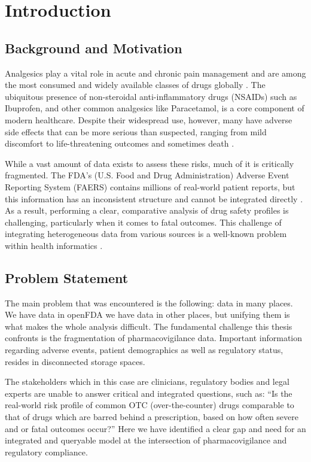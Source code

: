 \section{Introduction}
\subsection{Background and Motivation}
Analgesics play a vital role in acute and chronic pain management and are among the most consumed and widely available classes of drugs globally \cite{Jaeschke2015}. The ubiquitous presence of non-steroidal anti-inflammatory drugs (NSAIDs) such as Ibuprofen, and other common analgesics like Paracetamol, is a core component of modern healthcare. Despite their widespread use, however, many have adverse side effects that can be more serious than suspected, ranging from mild discomfort to life-threatening outcomes and sometimes death \cite{Harirforoosh2013}. 

While a vast amount of data exists to assess these risks, much of it is critically fragmented. The FDA's (U.S. Food and Drug Administration) Adverse Event Reporting System (FAERS) contains millions of real-world patient reports, but this information has an inconsistent structure and cannot be integrated directly \cite{FDA2023faers}. As a result, performing a clear, comparative analysis of drug safety profiles is challenging, particularly when it comes to fatal outcomes. This challenge of integrating heterogeneous data from various sources is a well-known problem within health informatics \cite{Häyrinen2014}.
\subsection{Problem Statement}
The main problem that was encountered is the following: data in many places. We have data in openFDA we have data in other places, but unifying them is what makes the whole analysis difficult. The fundamental challenge this thesis confronts is the fragmentation of pharmacovigilance data. Important information regarding adverse events, patient demographics as well as regulatory status, resides in disconnected storage spaces. 

The stakeholders which in this case are clinicians, regulatory bodies and legal experts are unable to answer critical and integrated questions, such as: “Is the real-world risk profile of common OTC (over-the-counter) drugs comparable to that of drugs which are barred behind a prescription, based on how often severe and or fatal outcomes occur?” Here we have identified a clear gap and need for an integrated and queryable model at the intersection of pharmacovigilance and regulatory compliance.

